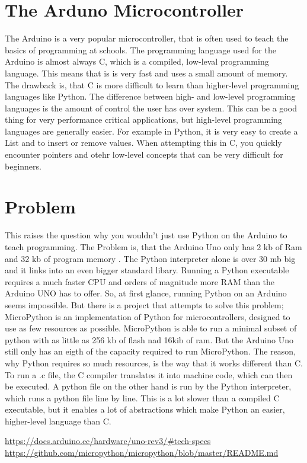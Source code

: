 \documentclass{article}
\begin{document}
\begin{multicols}{2}
\section{The Arduno Microcontroller}
The Arduino is a very popular microcontroller, that is often used to teach the basics of programming at schools. The programming language used for the Arduino is almost always C, which is a compiled, low-leval programming language. This means that is is very fast and uses a small amount of memory. The drawback is, that C is more difficult to learn than higher-level programming languages like Python. The difference between high- and low-level programming languages is the amount of control the user has over system. This can be a good thing for very performance critical applications, but high-level programming languages are generally easier. For example in Python, it is very easy to create a List and to insert or remove values. When attempting this in C, you quickly encounter pointers and otehr low-level concepts that can be very difficult for beginners.

\section{Problem}
This raises the question why you wouldn't just use Python on the Arduino to teach programming. The Problem is, that the Arduino Uno only has 2 kb of Ram and 32 kb of program memory \cite{Q1}. The Python interpreter alone is over 30 mb big and it links into an even bigger standard libary. Running a Python executable requires a much faster CPU and orders of magnitude more RAM than the Arduino UNO has to offer. So, at first glance, running Python on an Arduino seems impossible. But there is a project that attempts to solve this problem; MicroPython is an implementation of Python for microcontrollers, designed to use as few resources as possible. MicroPython is able to run a minimal subset of python with as little as 256 kb of flash nad 16kib of ram. But the Arduino Uno still only has an eigth of the capacity required to run MicroPython. The reason, why Python requires so much resources, is the way that it works different than C. To run a .c file, the C compiler translates it into machine code, which can then be executed. A python file on the other hand is run by the Python interpreter, which runs a python file line by line. This is a lot slower than a compiled C executable, but it enables a lot of abstractions which make Python an easier, higher-level language than C.



\begin{thebibliography}{99}
\url{https://docs.arduino.cc/hardware/uno-rev3/#tech-specs}
\url{https://github.com/micropython/micropython/blob/master/README.md}
\end{thebibliography}
\end{multicols}
\end{document}
